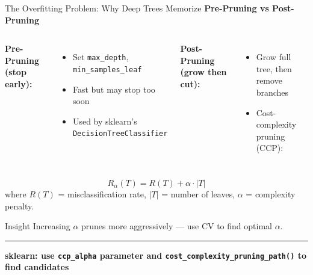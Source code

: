 \documentclass[8pt,aspectratio=169]{beamer}
\newcommand{\bottomnote}[1]{%
\vfill
\vspace{-2mm}
\textcolor{mllavender2}{\rule{\textwidth}{0.4pt}}
\vspace{1mm}
\footnotesize
\textbf{#1}
}
\newenvironment{compactlist}{%
  \begin{itemize}%
    \setlength{\itemsep}{2pt}%
    \setlength{\parskip}{0pt}%
    \setlength{\parsep}{0pt}%
}{%
  \end{itemize}%
}
\begin{document}
\begin{frame}[t]{The Overfitting Problem: Why Deep Trees Memorize}
\small
\textbf{Pre-Pruning vs Post-Pruning}

\vspace{1mm}
\footnotesize
\begin{columns}[T]
\textbf{Pre-Pruning (stop early):}
\begin{compactlist}
\item \footnotesize Set \texttt{max\_depth}, \texttt{min\_samples\_leaf}
\item \footnotesize Fast but may stop too soon
\item \footnotesize Used by sklearn's \texttt{DecisionTreeClassifier}
\end{compactlist}

\textbf{Post-Pruning (grow then cut):}
\begin{compactlist}
\item \footnotesize Grow full tree, then remove branches
\item \footnotesize Cost-complexity pruning (CCP):
\end{compactlist}
\end{columns}

\vspace{2mm}
\[
R_\alpha(T) = R(T) + \alpha \cdot |T|
\]
\footnotesize
where $R(T)$ = misclassification rate, $|T|$ = number of leaves, $\alpha$ = complexity penalty.

\vspace{2mm}
\begin{block}{Insight}
\footnotesize Increasing $\alpha$ prunes more aggressively --- use CV to find optimal $\alpha$.
\end{block}
\bottomnote{sklearn: use \texttt{ccp\_alpha} parameter and \texttt{cost\_complexity\_pruning\_path()} to find candidates}
\end{frame}
\end{document}
